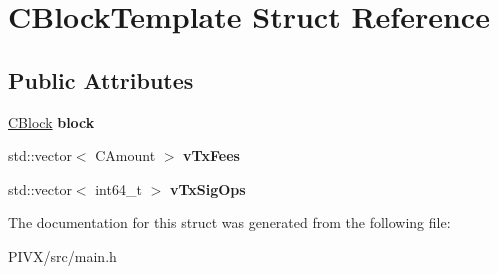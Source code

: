 \hypertarget{struct_c_block_template}{}\section{C\+Block\+Template Struct Reference}
\label{struct_c_block_template}
\subsection*{Public Attributes}
\begin{DoxyCompactItemize}
\item 
\mbox{\label{struct_c_block_template_a13261cbac4dc94f996d1b3ff78e41139}} 
\mbox{\hyperlink{class_c_block}{C\+Block}} {\bfseries block}
\item 
\mbox{\label{struct_c_block_template_a66287bde795cc8e8c8cb59c4e2302d49}} 
std\+::vector$<$ C\+Amount $>$ {\bfseries v\+Tx\+Fees}
\item 
\mbox{\label{struct_c_block_template_a13326eb92a7d2fc073d9f5660dfcdde5}} 
std\+::vector$<$ int64\+\_\+t $>$ {\bfseries v\+Tx\+Sig\+Ops}
\end{DoxyCompactItemize}


The documentation for this struct was generated from the following file\+:\begin{DoxyCompactItemize}
\item 
P\+I\+V\+X/src/main.\+h\end{DoxyCompactItemize}
